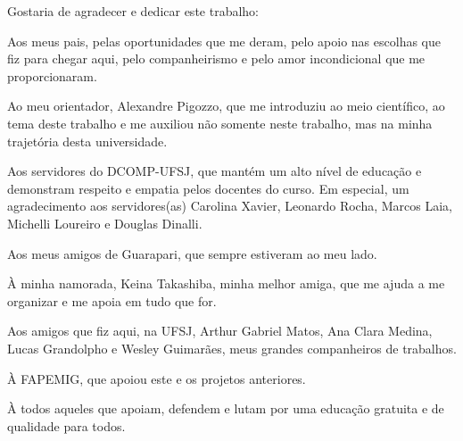 \begin{agradecimentos}
Gostaria de agradecer e dedicar este trabalho:

\noindent
Aos meus pais, pelas oportunidades que me deram, pelo apoio nas escolhas que fiz para chegar aqui, pelo companheirismo e pelo amor incondicional que me proporcionaram.

\noindent
Ao meu orientador, Alexandre Pigozzo, que me introduziu ao meio científico, ao tema deste trabalho e me auxiliou não somente neste trabalho, mas na minha trajetória desta universidade.

\noindent
Aos servidores do DCOMP-UFSJ, que mantém um alto nível de educação e demonstram respeito e empatia pelos docentes do curso. Em especial, um agradecimento aos servidores(as) Carolina Xavier, Leonardo Rocha, Marcos Laia, Michelli Loureiro e Douglas Dinalli.

\noindent
Aos meus amigos de Guarapari, que sempre estiveram ao meu lado.

\noindent
À minha namorada, Keina Takashiba, minha melhor amiga, que me ajuda a me organizar e me apoia em tudo que for.

\noindent
Aos amigos que fiz aqui, na UFSJ, Arthur Gabriel Matos, Ana Clara Medina, Lucas Grandolpho e Wesley Guimarães, meus grandes companheiros de trabalhos.

\noindent
À FAPEMIG, que apoiou este e os projetos anteriores.

\noindent
À todos aqueles que apoiam, defendem e lutam por uma educação gratuita e de qualidade para todos.
	
\end{agradecimentos}

\begin{epigrafe}
	\vspace*{\fill}
	\begin{flushright}

		
	\end{flushright}
\end{epigrafe}

